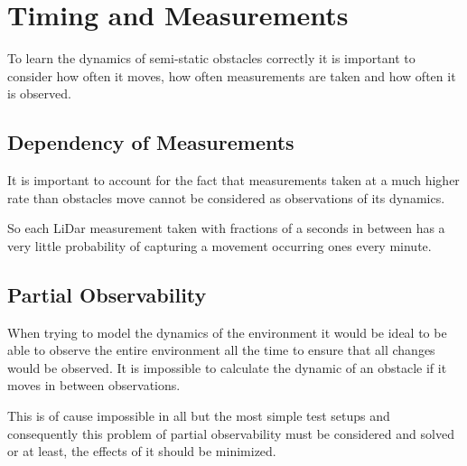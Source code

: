 \section{Timing and Measurements}
\label{sec:time_and_measurements}
To learn the dynamics of semi-static obstacles correctly it is important to consider how often it moves, how often measurements are taken and how often it is observed.

\subsection{Dependency of Measurements}
It is important to account for the fact that measurements taken at a much higher rate than obstacles move cannot be considered as observations of its dynamics. 

So each LiDar measurement taken with fractions of a seconds in between has a very little probability of capturing a movement occurring ones every minute. 
\subsection{Partial Observability}
When trying to model the dynamics of the environment it would be ideal to be able to observe the entire environment all the time to ensure that all changes would be observed.
It is impossible to calculate the dynamic of an obstacle if it moves in between observations.

This is of cause impossible in all but the most simple test setups and consequently this problem of partial observability must be considered and solved or at least, the effects of it should be minimized.

